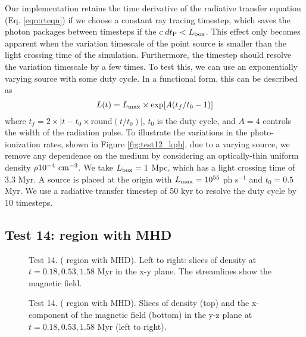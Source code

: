 \documentclass[12pt,preprint]{aastex}
\begin{document}
Our implementation retains the time derivative of the radiative
transfer equation (Eq. \ref{eqn:rteqn}) if we choose a constant ray
tracing timestep, which saves the photon packages between timesteps if
the $c\;dt_{\rm P} < L_{\rm box}$.  This effect only becomes apparent
when the variation timescale of the point source is smaller than the
light crossing time of the simulation.  Furthermore, the timestep
should resolve the variation timescale by a few times.  To test this,
we can use an exponentially varying source with some duty cycle.  In a
functional form, this can be described as
%
\begin{equation}
  \label{eqn:test13}
  L(t) = L_{\rm max} \times \exp[A(t_f/t_0 - 1)]
\end{equation}
%
where $t_f = 2 \times |t - t_0 \times \mathrm{round}(t/t_0)|$, $t_0$
is the duty cycle, and $A=4$ controls the width of the radiation
pulse.  To illustrate the variations in the photo-ionization rates,
shown in Figure \ref{fig:test12_kph}, due to a varying source, we
remove any dependence on the medium by considering an optically-thin
uniform density $\rho 10^{-4}~\cubecm$.  We take $L_{\rm box} = 1$
Mpc, which has a light crossing time of 3.3 Myr.  A source is placed
at the origin with $L_{\rm max} = 10^{55}$ ph s$^{-1}$ and $t_0 = 0.5$
Myr.  We use a radiative transfer timestep of 50 kyr to resolve the
duty cycle by 10 timesteps.

\subsection{Test 14:  region with MHD}

\begin{figure}[t]
  \caption{\label{fig:test14_1} Test 14. ( region with MHD).
    Left to right: slices of density at $t = 0.18, 0.53, 1.58$ Myr in
    the x-y plane.  The streamlines show the magnetic field.}
\end{figure}

\begin{figure}[t]
  \caption{\label{fig:test14_2} Test 14. ( region with
    MHD). Slices of density (top) and the x-component of the magnetic
    field (bottom) in the y-z plane at $t = 0.18, 0.53, 1.58$ Myr
    (left to right).}
\end{figure}
\end{document}
